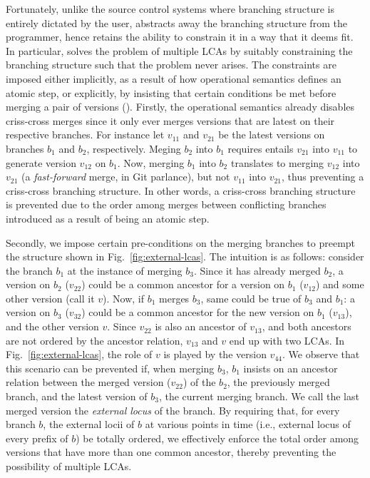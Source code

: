 Fortunately, unlike the source control systems where branching
structure is entirely dictated by the user, \name abstracts away the
branching structure from the programmer, hence retains the ability to
constrain it in a way that it deems fit. In particular, \name solves
the problem of multiple LCAs by suitably constraining the branching
structure such that the problem never arises. The constraints are
imposed either implicitly, as a result of how operational semantics
defines an atomic step, or explicitly, by insisting that certain
conditions be met before merging a pair of versions
(). Firstly, the operational semantics already
disables criss-cross merges since it only ever merges versions that
are latest on their respective branches. For instance let $v_{11}$ and
$v_{21}$ be the latest versions on branches $b_1$ and $b_2$,
respectively. Meging $b_2$ into $b_1$ requires entails $v_{21}$ into
$v_{11}$ to generate version $v_{12}$ on $b_1$. Now, merging $b_1$
into $b_2$ translates to merging $v_{12}$ into $v_{21}$ (a
\emph{fast-forward} merge, in Git parlance), but not $v_{11}$ into
$v_{21}$, thus preventing a criss-cross branching structure. In other
words, a criss-cross branching structure is prevented due to the
order among merges between conflicting branches introduced as a result
of  being an atomic step. 

Secondly, we impose certain pre-conditions on the merging branches to
preempt the structure shown in Fig.~\ref{fig:external-lcas}. The
intuition is as follows: consider the branch $b_1$ at the instance of
merging $b_3$. Since it has already merged $b_2$, a version on $b_2$
($v_{22}$) could be a common ancestor for a version on $b_1$
($v_{12}$) and some other version (call it $v$). Now, if $b_1$ merges
$b_3$, same could be true of $b_3$ and $b_1$: a version on $b_3$
($v_{32}$) could be a common ancestor for the new version on $b_1$
($v_{13}$), and the other version $v$. Since $v_{22}$ is also an
ancestor of $v_{13}$, and both ancestors are not ordered by the
ancestor relation, $v_{13}$ and $v$ end up with two LCAs. In
Fig.~\ref{fig:external-lcas}, the role of $v$ is played by the version
$v_{44}$. We observe that this scenario can be prevented if, when
merging $b_3$, $b_1$ insists on an ancestor relation between the
merged version ($v_{22}$) of the $b_2$, the previously merged branch,
and the latest version of $b_3$, the current merging branch. We call
the last merged version the \emph{external locus} of the branch. By
requiring that, for every branch $b$, the external locii of $b$ at
various points in time (i.e., external locus of every prefix of $b$)
be totally ordered, we effectively enforce the total order among
versions that have more than one common ancestor, thereby preventing
the possibility of multiple LCAs.

